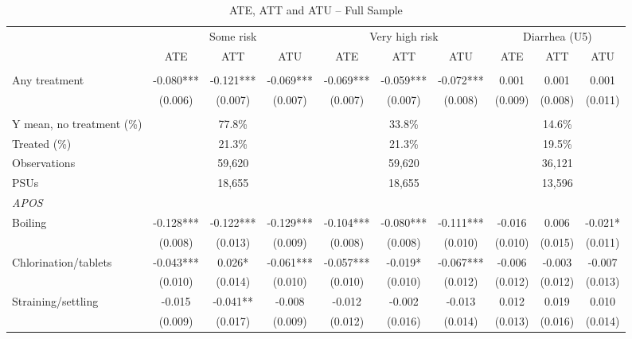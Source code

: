 \documentclass[10pt]{article}
\begin{document}
\begin{table}[H]
\centering
\caption{ATE, ATT and ATU -- Full Sample}
\label{tab:ate-att-atu-clustered-aggregated}
\scriptsize
\setlength{\tabcolsep}{4pt}
\renewcommand{\arraystretch}{0.92}
\begin{adjustbox}{max width=\linewidth}
\begin{tabular}{lccccccccc}
\hline\hline
 & \multicolumn{3}{c}{Some risk} & \multicolumn{3}{c}{Very high risk} & \multicolumn{3}{c}{Diarrhea (U5)} \\
\cmidrule(lr){2-4}\cmidrule(lr){5-7}\cmidrule(lr){8-10}
 & ATE & ATT & ATU & ATE & ATT & ATU & ATE & ATT & ATU \\
\addlinespace[3pt]
\multicolumn{10}{l}{\textit{IRM}} \\
Any treatment & -0.080*** & -0.121*** & -0.069*** & -0.069*** & -0.059*** & -0.072*** & 0.001 & 0.001 & 0.001 \\
 & (0.006) & (0.007) & (0.007) & (0.007) & (0.007) & (0.008) & (0.009) & (0.008) & (0.011) \\
\addlinespace[6pt]
\multicolumn{10}{l}{\textit{Descriptive statistics and sample}} \\
Y mean, no treatment (\%) & \multicolumn{3}{c}{77.8\%} & \multicolumn{3}{c}{33.8\%} & \multicolumn{3}{c}{14.6\%} \\
Treated (\%) & \multicolumn{3}{c}{21.3\%} & \multicolumn{3}{c}{21.3\%} & \multicolumn{3}{c}{19.5\%} \\
Observations & \multicolumn{3}{c}{59,620} & \multicolumn{3}{c}{59,620} & \multicolumn{3}{c}{36,121} \\
PSUs & \multicolumn{3}{c}{18,655} & \multicolumn{3}{c}{18,655} & \multicolumn{3}{c}{13,596} \\
\midrule
\multicolumn{10}{l}{\textit{APOS}} \\
Boiling & -0.128*** & -0.122*** & -0.129*** & -0.104*** & -0.080*** & -0.111*** & -0.016 & 0.006 & -0.021* \\
 & (0.008) & (0.013) & (0.009) & (0.008) & (0.008) & (0.010) & (0.010) & (0.015) & (0.011) \\
Chlorination/tablets & -0.043*** & 0.026* & -0.061*** & -0.057*** & -0.019* & -0.067*** & -0.006 & -0.003 & -0.007 \\
 & (0.010) & (0.014) & (0.010) & (0.010) & (0.010) & (0.012) & (0.012) & (0.012) & (0.013) \\
Straining/settling & -0.015 & -0.041** & -0.008 & -0.012 & -0.002 & -0.013 & 0.012 & 0.019 & 0.010 \\
 & (0.009) & (0.017) & (0.009) & (0.012) & (0.016) & (0.014) & (0.013) & (0.016) & (0.014) \\

\end{tabular}
\end{adjustbox}
\end{table}
\end{document}
